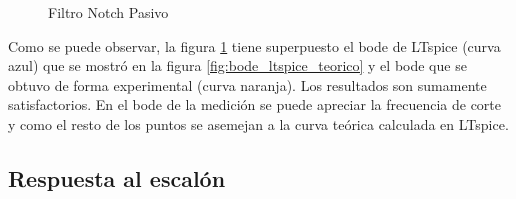 \begin{figure}[H] 
\begin{center}
\caption{Filtro Notch Pasivo}
\label{fig:superpuesto}
\end{center}
\end{figure}


Como se puede observar, la figura \ref{fig:superpuesto} tiene superpuesto el bode
de LTspice (curva azul) que se mostró en la figura \ref{fig:bode_ltspice_teorico} y el bode que se obtuvo de forma experimental (curva naranja). Los resultados son sumamente satisfactorios. En el bode de la medición se puede apreciar la frecuencia de corte y como el resto de los puntos se asemejan a la curva teórica calculada en LTspice. 


\subsection{Respuesta al escalón}


